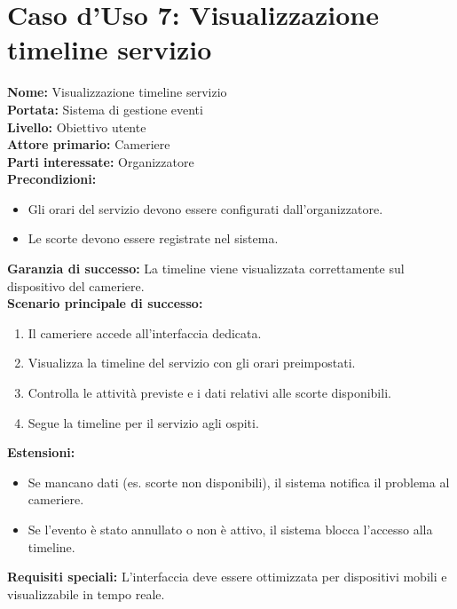 \documentclass[a4paper,12pt]{article}
\begin{document}
\section*{\textcolor{sectioncolor}{Caso d'Uso 7: Visualizzazione timeline servizio}}
\textcolor{textcolor}{
\textbf{Nome:} Visualizzazione timeline servizio\\
\textbf{Portata:} Sistema di gestione eventi\\
\textbf{Livello:} Obiettivo utente\\
\textbf{Attore primario:} Cameriere\\
\textbf{Parti interessate:} Organizzatore\\
\textbf{Precondizioni:}
\begin{itemize}
    \item Gli orari del servizio devono essere configurati dall'organizzatore.
    \item Le scorte devono essere registrate nel sistema.
\end{itemize}
\textbf{Garanzia di successo:} La timeline viene visualizzata correttamente sul dispositivo del cameriere.\\
\textbf{Scenario principale di successo:}
\begin{enumerate}
    \item Il cameriere accede all'interfaccia dedicata.
    \item Visualizza la timeline del servizio con gli orari preimpostati.
    \item Controlla le attività previste e i dati relativi alle scorte disponibili.
    \item Segue la timeline per il servizio agli ospiti.
\end{enumerate}
\textbf{Estensioni:}
\begin{itemize}
    \item  Se mancano dati (es. scorte non disponibili), il sistema notifica il problema al cameriere.
    \item  Se l'evento è stato annullato o non è attivo, il sistema blocca l'accesso alla timeline.
\end{itemize}
\textbf{Requisiti speciali:} L'interfaccia deve essere ottimizzata per dispositivi mobili e visualizzabile in tempo reale.
}
\end{document}
